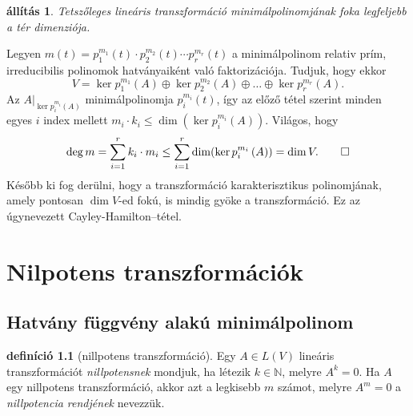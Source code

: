 \documentclass[9pt, a4paper, showtrims]{memoir}
\makeatletter
\renewenvironment{proof}[1][\proofname]
    {\par\pushQED{\qed}%
    \normalfont \topsep6\p@\@plus6\p@\relax
    \trivlist
    \item[\hskip\labelsep
        \itshape
    #1\@addpunct{:}]\ignorespaces}
    {\popQED\endtrivlist\@endpefalse}
\theoremstyle{plain}
\newtheorem{proposition}{állítás}[chapter]
\theoremstyle{remark}
\theoremstyle{definition}
\newtheorem{definition}[proposition]{definíció}
\makeatother
\begin{document}
    \begin{proposition}
        Tetszőleges lineáris transzformáció minimálpolinomjának foka legfeljebb a tér dimenziója.
        \label{th:minpol}
    \end{proposition}
    \begin{proof}
        Legyen 
        $
        m\left( t \right)
        =
        p_1^{m_1}\left( t \right)\cdot
        p_2^{m_2}\left( t \right)\cdots
        p_r^{m_r}\left( t \right)
        $
        a minimálpolinom relativ prím, irreducibilis polinomok hatványaiként való faktorizációja.
        Tudjuk, hogy ekkor 
        \[
            V
            =
            \ker p_1^{m_1}\left( A \right)
            \oplus
            \ker p_2^{m_2}\left( A \right)
            \oplus\dots\oplus
            \ker p_r^{m_r}\left( A \right).
        \]
        Az $A|_{\ker p_i^{m_i}\left( A \right)}$ minimálpolinomja $p_i^{m_i}\left( t \right)$, így az előző tétel szerint minden egyes $i$ index mellett
        $
        m_i\cdot k_i\leq \dim(\ker p_i^{m_i}\left( A \right)).
        $
        Világos, hogy
        \[
            \deg m
            =
            \sum_{i=1}^rk_i\cdot m_i
            \leq
            \sum_{i=1}^r\dim(\ker p_i^{m_i}\left( A \right))
            =
            \dim V.\qedhere
        \]
    \end{proof}
    Később ki fog derülni,
    hogy a transzformáció karakterisztikus polinomjának, amely pontosan $\dim V$-ed fokú,
    is mindig gyöke a transzformáció.
    Ez az úgynevezett Cayley-Hamilton--tétel.
\chapter{Nilpotens transzformációk}
\section{Hatvány függvény alakú minimálpolinom}
\begin{definition}[nillpotens transzformáció]
    Egy $A\in L\left( V \right)$ lineáris transzformációt 
    \emph{nillpotensnek} mondjuk, ha
    létezik $k\in\mathbb{N}$, melyre $A^k=0$.
    Ha $A$ egy nillpotens transzformáció, akkor azt a legkisebb $m$ számot, melyre $A^m=0$ a \emph{nillpotencia rendjének} nevezzük.
\end{definition}
\end{document}
